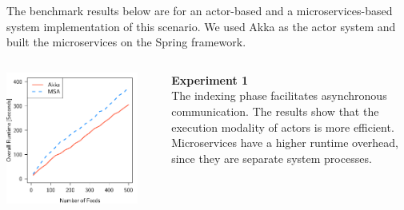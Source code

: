 \documentclass[final,hyperref={pdfpagelabels=true}]{beamer}
\begin{document}
\begin{frame}
\begin{columns}[t]
\begin{column}{.43\textwidth}
{\begin{justify}
        The benchmark results below are for an actor-based and a microservices-based system implementation of this scenario. We used Akka as the actor system and built the microservices on the Spring framework.
        \end{justify}
      }

      \renewcommand\sfdefault{lmss} %
      
      \begin{columns}[t]
        \begin{column}{.46\textwidth}
          \begin{center}
          \includegraphics[width=1\textwidth]{graphics/eval-index-overall.pdf}
          \end{center}
        \end{column}
        \begin{column}{.08\textwidth}
        \end{column}
        \begin{column}{.46\textwidth}
          {\lmodern
            \begin{justify}
              \textsf{\textbf{Experiment 1}} \\
              \vspace*{.5\baselineskip}
              The indexing phase facilitates asynchronous communication. The results show that the execution modality of actors is more efficient. Microservices have a higher runtime overhead, since they are separate system processes. 
            \end{justify}
          }
        \end{column}
      \end{columns}


\end{column}
\end{columns}
\end{frame}
\end{document}
